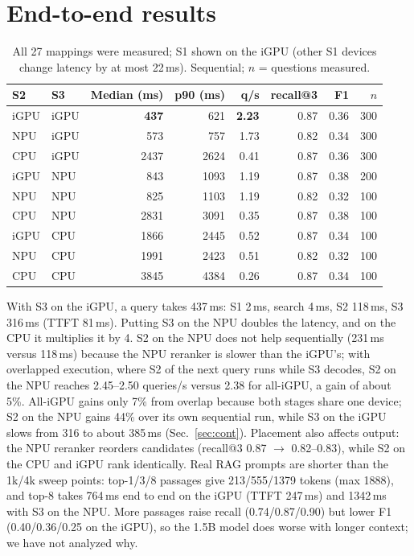 \documentclass[10pt]{article}
\begin{document}
\section{End-to-end results}
\begin{table}[H]\centering\small
\caption{All 27 mappings were measured; S1 shown on the iGPU (other S1 devices change latency by at most 22\,ms). Sequential; $n$ = questions measured.}\label{tab:e2e}
\begin{tabular}{llrrrrrr}\toprule
S2 & S3 & Median (ms) & p90 (ms) & q/s & recall@3 & F1 & $n$\\\midrule
iGPU & iGPU & \textbf{437} & 621 & \textbf{2.23} & 0.87 & 0.36 & 300\\
NPU & iGPU & 573 & 757 & 1.73 & 0.82 & 0.34 & 300\\
CPU & iGPU & 2437 & 2624 & 0.41 & 0.87 & 0.36 & 300\\
iGPU & NPU & 843 & 1093 & 1.19 & 0.87 & 0.38 & 200\\
NPU & NPU & 825 & 1103 & 1.19 & 0.82 & 0.32 & 100\\
CPU & NPU & 2831 & 3091 & 0.35 & 0.87 & 0.38 & 100\\
iGPU & CPU & 1866 & 2445 & 0.52 & 0.87 & 0.34 & 100\\
NPU & CPU & 1991 & 2423 & 0.51 & 0.82 & 0.32 & 100\\
CPU & CPU & 3845 & 4384 & 0.26 & 0.87 & 0.34 & 100\\\bottomrule
\end{tabular}
\end{table}

With S3 on the iGPU, a query takes 437\,ms: S1 2\,ms, search 4\,ms, S2 118\,ms, S3 316\,ms (TTFT 81\,ms). Putting S3 on the NPU doubles the latency, and on the CPU it multiplies it by 4. S2 on the NPU does not help sequentially (231\,ms versus 118\,ms) because the NPU reranker is slower than the iGPU's; with overlapped execution, where S2 of the next query runs while S3 decodes, S2 on the NPU reaches 2.45--2.50 queries/s versus 2.38 for all-iGPU, a gain of about 5\%. All-iGPU gains only 7\% from overlap because both stages share one device; S2 on the NPU gains 44\% over its own sequential run, while S3 on the iGPU slows from 316 to about 385\,ms (Sec.~\ref{sec:cont}). Placement also affects output: the NPU reranker reorders candidates (recall@3 0.87 $\rightarrow$ 0.82--0.83), while S2 on the CPU and iGPU rank identically. Real RAG prompts are shorter than the 1k/4k sweep points: top-1/3/8 passages give 213/555/1379 tokens (max 1888), and top-8 takes 764\,ms end to end on the iGPU (TTFT 247\,ms) and 1342\,ms with S3 on the NPU. More passages raise recall (0.74/0.87/0.90) but lower F1 (0.40/0.36/0.25 on the iGPU), so the 1.5B model does worse with longer context; we have not analyzed why.
\end{document}

